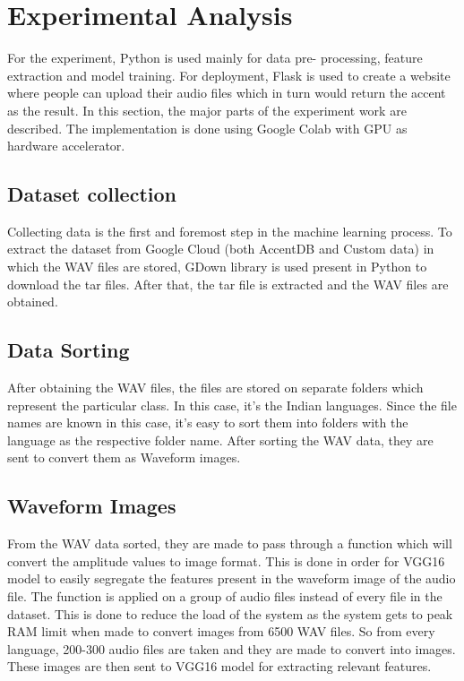 \documentclass[pdflatex]{sn-jnl}%
\theoremstyle{thmstyleone}%
\theoremstyle{thmstyletwo}%
\theoremstyle{thmstylethree}%
\begin{document}
\section{Experimental Analysis}\label{sec4}
For the experiment, Python is used mainly for data pre-
processing, feature extraction and model training. For deployment, Flask is used to create a website where people can
upload their audio files which in turn would return the accent
as the result. In this section, the major parts of the experiment
work are described. The implementation is done using Google
Colab with GPU as hardware accelerator.

\subsection{Dataset collection}
Collecting data is the first and foremost step in the machine learning process. 
To extract the dataset from Google Cloud (both AccentDB and Custom data) in which the WAV files are stored, GDown library is used present in Python to download the tar files. After that, the tar file is extracted and the WAV files are obtained.


\subsection{Data Sorting}
After obtaining the WAV files, the files are stored on
separate folders which represent the particular class. In this
case, it’s the Indian languages. Since the file names are known
in this case, it’s easy to sort them into folders with the language
as the respective folder name. After sorting the WAV data, they
are sent to convert them as Waveform images.

\subsection{Waveform Images}
From the WAV data sorted, they are made to pass through
a function which will convert the amplitude values to image
format. This is done in order for VGG16 model to easily
segregate the features present in the waveform image of the
audio file.
The function is applied on a group of audio files instead
of every file in the dataset. This is done to reduce the load of the system as the system gets to peak RAM limit when
made to convert images from 6500 WAV files. So from every
language, 200-300 audio files are taken and they are made to
convert into images. These images are then sent to VGG16
model for extracting relevant features.
\end{document}
